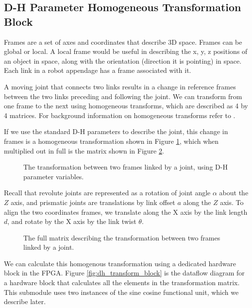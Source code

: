 \subsection{D-H Parameter Homogeneous Transformation Block}

Frames are a set of axes and coordinates that describe 3D space. Frames can be global or local. A local frame would be useful in describing the x, y, z positions of an object in space, along with the orientation (direction it is pointing) in space. Each link in a robot appendage has a frame associated with it.

A moving joint that connects two links results in a change in reference frames between the two links preceding and following the joint. We can transform from one frame to the next using homogeneous transforms, which are described as 4 by 4 matrices. For background information on homogeneous transforms refer to \cite{frames}.

If we use the standard D-H parameters to describe the joint, this change in frames is a homogeneous transformation shown in Figure \ref{fig:dh_transform_equation}, which when multiplied out in full is the matrix shown in Figure \ref{fig:dh_transform_matrix}. 

\begin{figure}[ht]
\center
{}
\caption{The transformation between two frames linked by a joint, using D-H parameter variables.}
\label{fig:dh_transform_equation}
\end{figure}

Recall that revolute joints are represented as a rotation of joint angle $\alpha$ about the $Z$ axis, and prismatic joints are translations by link offset $a$ along the $Z$ axis. To align the two coordinates frames, we translate along the X axis by the link length $d$, and rotate by the X axis by the link twist $\theta$.

\begin{figure}[ht]
\center
{}
\caption{The full matrix describing the transformation between two frames linked by a joint.}
\label{fig:dh_transform_matrix}
\end{figure}

We can calculate this homogenous transformation using a dedicated hardware block in the FPGA. Figure \ref{fig:dh_transform_block} is the dataflow diagram for a hardware block that calculates all the elements in the transformation matrix. This submodule uses two instances of the sine cosine functional unit, which we describe later.

